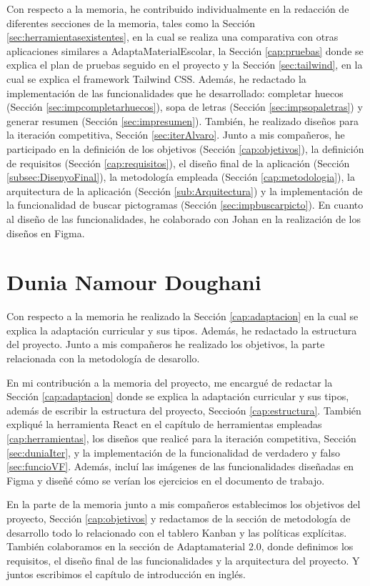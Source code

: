 Con respecto a la memoria, he contribuido individualmente en la redacción de diferentes secciones de la memoria, tales como la Sección \ref{sec:herramientasexistentes}, en la cual se realiza una comparativa con otras aplicaciones similares a AdaptaMaterialEscolar, la Sección \ref{cap:pruebas} donde se explica el plan de pruebas seguido en el proyecto y la Sección \ref{sec:tailwind}, en la cual se explica el framework Tailwind CSS. Además, he redactado la implementación de las funcionalidades que he desarrollado: completar huecos (Sección \ref{sec:impcompletarhuecos}), sopa de letras (Sección \ref{sec:impsopaletras}) y generar resumen (Sección \ref{sec:impresumen}). También, he realizado diseños para la iteración competitiva, Sección \ref{sec:iterAlvaro}. Junto a mis compañeros, he participado en la definición de los objetivos (Sección \ref{cap:objetivos}), la definición de requisitos (Sección \ref{cap:requisitos}), el diseño final de la aplicación (Sección \ref{subsec:DisenyoFinal}), la metodología empleada (Sección \ref{cap:metodologia}), la arquitectura de la aplicación (Sección \ref{sub:Arquitectura}) y la implementación de la funcionalidad de buscar pictogramas (Sección \ref{sec:impbuscarpicto}). En cuanto al diseño de las funcionalidades, he colaborado con Johan en la realización de los diseños en Figma.

\section{Dunia Namour Doughani}
Con respecto a la memoria he realizado la Sección \ref{cap:adaptacion} en la cual se explica la adaptación curricular y sus tipos. Además, he redactado la estructura del proyecto. Junto a mis compañeros he realizado los objetivos, la parte relacionada con la metodología de desarollo.

En mi contribución a la memoria del proyecto, me encargué de redactar la Sección \ref{cap:adaptacion} donde se explica la adaptación curricular y sus tipos, además de escribir la estructura del proyecto, Seccioón \ref{cap:estructura}. También expliqué la herramienta React en el capítulo de herramientas empleadas \ref{cap:herramientas}, los diseños que realicé para la iteración competitiva, Sección \ref{sec:duniaIter}, y la implementación de la funcionalidad de verdadero y falso \ref{sec:funcioVF}. Además, incluí las imágenes de las funcionalidades diseñadas en Figma y diseñé cómo se verían los ejercicios en el documento de trabajo.

En la parte de la memoria junto a mis compañeros establecimos los objetivos del proyecto, Sección \ref{cap:objetivos} y redactamos de la sección de metodología de desarrollo todo lo relacionado con el tablero Kanban y las políticas explícitas. También colaboramos en la sección de Adaptamaterial 2.0, donde definimos los requisitos, el diseño final de las funcionalidades y la arquitectura del proyecto. Y juntos escribimos el capítulo de introducción en inglés.

